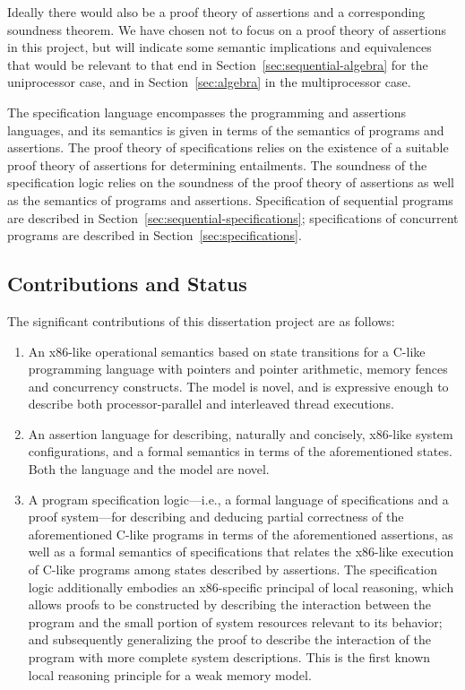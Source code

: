 \documentclass[11pt]{report}
\begin{document}
Ideally there would also be a proof theory of assertions and a corresponding soundness theorem. We have chosen not to focus on a proof theory of assertions in this project, but will indicate some semantic implications and equivalences that would be relevant to that end in Section~\ref{sec:sequential-algebra} for the uniprocessor case, and in Section~\ref{sec:algebra} in the multiprocessor case.

The specification language encompasses the programming and assertions languages, and its semantics is given in terms of the semantics of programs and assertions. The proof theory of specifications relies on the existence of a suitable proof theory of assertions for determining entailments. The soundness of the specification logic relies on the soundness of the proof theory of assertions as well as the semantics of programs and assertions. Specification of sequential programs are described in Section~\ref{sec:sequential-specifications}; specifications of concurrent programs are described in Section~\ref{sec:specifications}.

\subsection{Contributions and Status}

The significant contributions of this dissertation project are as follows:

\begin{enumerate}
  \item An x86-like operational semantics based on state transitions for a C-like programming language with pointers and pointer arithmetic, memory fences and concurrency constructs. The model is novel, and is expressive enough to describe both processor-parallel and interleaved thread executions. 

  \item An assertion language for describing, naturally and concisely, x86-like system configurations, and a formal semantics in terms of the aforementioned states. Both the language and the model are novel. 

  \item A program specification logic---i.e., a formal language of specifications and a proof system---for describing and deducing partial correctness of the aforementioned C-like programs in terms of the aforementioned assertions, as well as a formal semantics of specifications that relates the x86-like execution of C-like programs among states described by assertions. The specification logic additionally embodies an x86-specific principal of local reasoning, which allows proofs to be constructed by describing the interaction between the program and the small portion of system resources relevant to its behavior; and subsequently generalizing the proof to describe the interaction of the program with more complete system descriptions. This is the first known local reasoning principle for a weak memory model. 
\end{enumerate}
\end{document}
